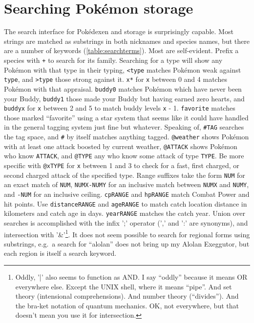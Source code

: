 \section{Searching Pokémon storage\label{sec:searching}}
The search interface for Pokédexen and storage is surprisingly capable.
Most strings are matched as substrings in both nicknames and species names,
 but there are a number of keywords (\autoref{table:searchterms}).
Most are self-evident.
Prefix a species with \texttt{+} to search for its family.
Searching for a type will show any Pokémon with that type in their typing,
 \texttt{<type} matches Pokémon weak against \texttt{type},
 and \texttt{>type} those strong against it.
\texttt{x*} for \texttt{x} between 0 and 4 matches Pokémon with that appraisal.
\texttt{buddy0} matches Pokémon which have never been your Buddy,
 \texttt{buddy1} those made your Buddy but having earned zero hearts,
 and \texttt{buddyx} for \texttt{x} between 2 and 5 to match buddy
 levels \texttt{x} - 1.
\texttt{favorite} matches those marked ``favorite'' using a star system that
 seems like it could have handled in the general tagging system just fine
 but whatever.
Speaking of, \texttt{\#TAG} searches the tag space, and \texttt{\#} by itself
 matches anything tagged.
\texttt{@weather} shows Pokémon with at least one attack boosted by current
 weather, \texttt{@ATTACK} shows Pokémon who know \texttt{ATTACK}, and \texttt{@TYPE}
 any who know some attack of type \texttt{TYPE}.
Be more specific with \texttt{@xTYPE} for \texttt{x} between 1 and 3 to check
  for a fast, first charged, or second charged attack of the specified type.
Range suffixes take the form \texttt{NUM} for an exact match of \texttt{NUM},
  \texttt{NUMX-NUMY} for an inclusive match between \texttt{NUMX} and \texttt{NUMY},
  and \texttt{-NUM} for an inclusive ceiling.
\texttt{cpRANGE} and \texttt{hpRANGE} match Combat Power and hit points.
Use \texttt{distanceRANGE} and \texttt{ageRANGE} to match catch location
  distance in kilometers and catch age in days.
\texttt{yearRANGE} matches the catch year.
Union over searches is accomplished with the infix ';' operator (',' and ':' are synonyms),
  and intersection with '\&'\footnote{Oddly, '|' also seems to function as AND. I say ``oddly'' because it means OR everywhere else.
  Except the UNIX shell, where it means ``pipe''.
  And set theory (intensional comprehensions).
  And number theory (``divides'').
  And the bra-ket notation of quantum mechanics.
  OK, not everywhere, but that doesn't mean you use it for intersection.}.
It does not seem possible to search for regional forms using substrings,
 e.g.\ a search for ``alolan'' does not bring up my Alolan Exeggutor,
 but each region is itself a search keyword.

